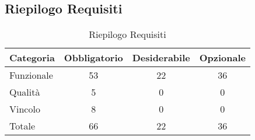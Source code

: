 \subsection{Riepilogo Requisiti}{ 
\renewcommand*{\arraystretch}{1.4} 
\begin{table}[h] 
 \begin{center} 
\begin{tabular}[c]{| p{2.5cm} | c | c | c |}  
\hline \textbf{Categoria} & \textbf{Obbligatorio} & \textbf{Desiderabile} & \textbf{Opzionale} \\ \hline 
Funzionale & 53 & 22 & 36\\ 
 \hline 
Qualità & 5 & 0 & 0\\ 
 \hline 
Vincolo & 8 & 0 & 0\\ 
 \hline 
Totale & 66 & 22 & 36\\ 
 \hline 
\end{tabular} 
 \caption{Riepilogo Requisiti\label{tab:riepilogo}}\end{center} 
 \end{table}}